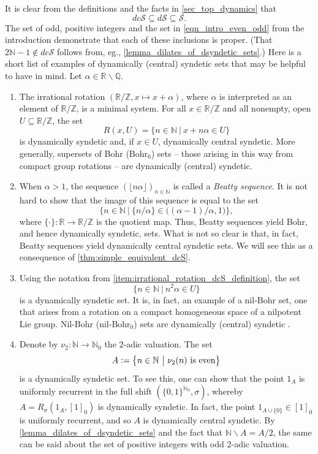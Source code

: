 \documentclass[letter,11pt]{article}
\theoremstyle{plain}
\theoremstyle{definition}
\theoremstyle{plain}
\theoremstyle{plain}
\numberwithin{equation}{section}
\newcommand{\N}{\mathbb{N}}
\newcommand{\Z}{\mathbb{Z}}
\newcommand{\R}{\mathbb{R}}
\newcommand{\Q}{\mathbb{Q}}
\newcommand{\defeq}{\vcentcolon=}
\renewcommand{\setminus}{\backslash}
\newcommand{\syndetic}{\mathcal{S}}
\newcommand{\dsyndetic}{d\mathcal{S}}
\newcommand{\dcsyndetic}{dc\mathcal{S}}
\begin{document}
It is clear from the definitions and the facts in \cref{sec_top_dynamics} that
\[\dcsyndetic \subseteq \dsyndetic \subseteq \syndetic.\]
The set of odd, positive integers and the set in \eqref{eqn_intro_even_odd} from the introduction demonstrate that each of these inclusions is proper. (That $2\N-1 \not\in \dcsyndetic$ follows from, eg., \cref{lemma_dilates_of_dsyndetic_sets}.)  Here is a short list of examples of dynamically (central) syndetic sets that may be helpful to have in mind.  Let $\alpha \in \R \setminus \Q$.
\begin{enumerate}
    \item \label{item:irrational_rotation_dcS_definition}
    The irrational rotation $(\R / \Z, x \mapsto x + \alpha)$, where $\alpha$ is interpreted as an element of $\R / \Z$, is a minimal system.  For all $x \in \R / \Z$ and all nonempty, open $U \subseteq \R / \Z$, the set
    \[R(x,U) = \big\{ n \in \N \ \big| \  x + n \alpha  \in U \big\}\]
    is dynamically syndetic and, if $x \in U$, dynamically central syndetic.  More generally, supersets of Bohr (Bohr$_0$) sets -- those arising in this way from compact group rotations -- are dynamically (central) syndetic.

    \item When $\alpha > 1$, the sequence $(\lfloor n \alpha \rfloor)_{n \in \N}$ is called a \emph{Beatty sequence}.  It is not hard to show that the image of this sequence is equal to the set
    \[\big\{ n \in \N \ \big| \ \big\{ n / \alpha \} \in \big( (\alpha-1) / \alpha, 1 \big) \big\},\]
    where $\{ \cdot \}: \R \to \R / \Z$ is the quotient map.  Thus, Beatty sequences yield Bohr, and hence dynamically syndetic, sets.  What is not so clear is that, in fact, Beatty sequences yield dynamically central syndetic sets.  We will see this as a consequence of \cref{thm:simple_equivalent_dcS}.

    \item Using the notation from \eqref{item:irrational_rotation_dcS_definition}, the set
    \[\big\{ n \in \N \ \big| \  n^2 \alpha  \in U \big\}\]
    is a dynamically syndetic set.  It is, in fact, an example of a nil-Bohr set, one that arises from a rotation on a compact homogeneous space of a nilpotent Lie group.  Nil-Bohr (nil-Bohr$_0$) sets are dynamically (central) syndetic \cite{Host-Kra_nilbohr}.
    
    \item \label{item_dcs_two_adic_example} Denote by $\nu_2: \N \to \N_0$ the 2-adic valuation.  The set
    \[A \defeq \big\{ n \in \N \ \big | \ \nu_2(n) \text{ is even} \big \}\]
    is a dynamically syndetic set.  To see this, one can show that the point $1_A$ is uniformly recurrent in the full shift $(\{0,1\}^{\N_0},\sigma)$, whereby $A = R_\sigma(1_A,[1]_0)$ is dynamically syndetic.  In fact, the point $1_{A \cup \{0\}} \in [1]_0$ is uniformly recurrent, and so $A$ is dynamically central syndetic.  By \cref{lemma_dilates_of_dsyndetic_sets} and the fact that $\N \setminus A = A / 2$, the same can be said about the set of positive integers with odd 2-adic valuation.
    

\end{enumerate}
\end{document}
